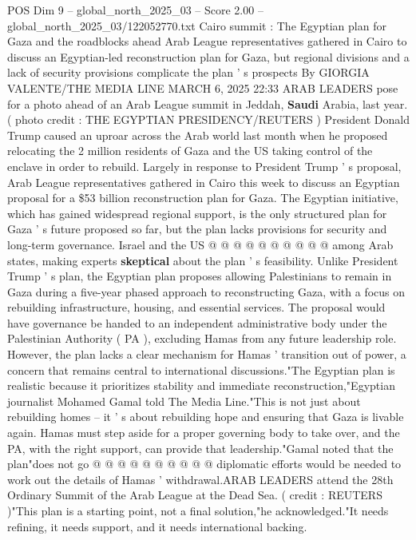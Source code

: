 \begin{textsample}{POS Dim 9 – global\_north\_2025\_03 – Score 2.00 – global\_north\_2025\_03/122052770.txt}  \label{ex:f9_pos_297}
Cairo summit : The Egyptian plan for Gaza and the roadblocks ahead Arab League representatives gathered in Cairo to discuss an Egyptian-led reconstruction plan for Gaza, but regional divisions and a lack of security provisions complicate the plan ' s prospects By GIORGIA VALENTE/THE MEDIA LINE MARCH 6, 2025 22:33 ARAB LEADERS pose for a photo ahead of an Arab League summit in Jeddah, \textbf{Saudi} Arabia, last year. ( photo credit : THE EGYPTIAN PRESIDENCY/REUTERS ) President Donald Trump caused an uproar across the Arab world last month when he proposed relocating the 2 million residents of Gaza and the US taking control of the enclave in order to rebuild.
Largely in response to President Trump ' s proposal, Arab League representatives gathered in Cairo this week to discuss an Egyptian proposal for a \$53 billion reconstruction plan for Gaza.
The Egyptian initiative, which has gained widespread regional support, is the only structured plan for Gaza ' s future proposed so far, but the plan lacks provisions for security and long-term governance.
Israel and the US @ @ @ @ @ @ @ @ @ @ among Arab states, making experts \textbf{skeptical} about the plan ' s feasibility.
Unlike President Trump ' s plan, the Egyptian plan proposes allowing Palestinians to remain in Gaza during a five-year phased approach to reconstructing Gaza, with a focus on rebuilding infrastructure, housing, and essential services.
The proposal would have governance be handed to an independent administrative body under the Palestinian Authority ( PA ), excluding Hamas from any future leadership role.
However, the plan lacks a clear mechanism for Hamas ' transition out of power, a concern that remains central to international discussions."The Egyptian plan is realistic because it prioritizes stability and immediate reconstruction,"Egyptian journalist Mohamed Gamal told The Media Line."This is not just about rebuilding homes -- it ' s about rebuilding hope and ensuring that Gaza is livable again.
Hamas must step aside for a proper governing body to take over, and the PA, with the right support, can provide that leadership."Gamal noted that the plan"does not go @ @ @ @ @ @ @ @ @ @ diplomatic efforts would be needed to work out the details of Hamas ' withdrawal.ARAB LEADERS attend the 28th Ordinary Summit of the Arab League at the Dead Sea. ( credit : REUTERS )"This plan is a starting point, not a final solution,"he acknowledged."It needs refining, it needs support, and it needs international backing.

\end{textsample}
